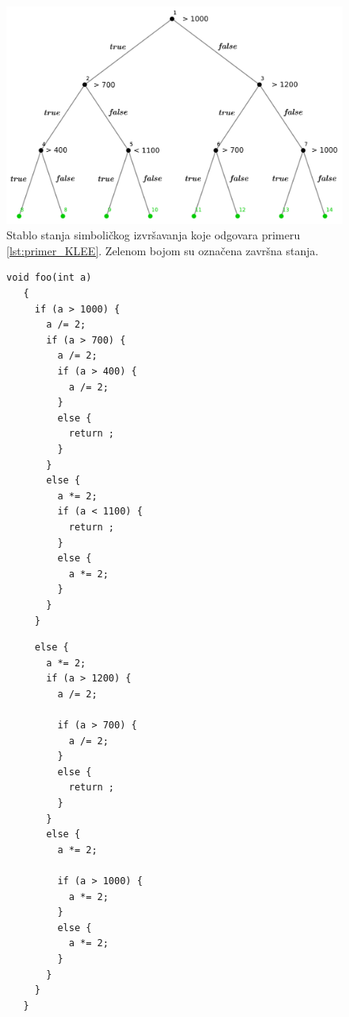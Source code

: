 \documentclass[12pt,oneside]{memoir}
\begin{document}
\begin{figure}[ht]
    \centering
    \includegraphics[width=\linewidth]{stablo_primer_1.png}
    \caption{Stablo stanja simboličkog izvršavanja koje odgovara primeru \ref{lst:primer_KLEE}. Zelenom bojom su označena završna stanja.}
    \label{fig:moj_primer}
\end{figure}

\begin{figure}
\noindent\begin{minipage}[t]{.45\textwidth}
\begin{lstlisting}[label={lst:primer_KLEE}, captionpos=b]
   void foo(int a) 
   {
     if (a > 1000) {
       a /= 2;
       if (a > 700) {
         a /= 2;
         if (a > 400) {
           a /= 2;
         }
         else {
           return ;
         }
       }
       else {
         a *= 2;
         if (a < 1100) {
           return ;
         }
         else {
           a *= 2;
         }
       }
     }
\end{lstlisting}
\end{minipage}\hfill
\begin{minipage}[t]{.45\textwidth}
\begin{lstlisting}
     else {
       a *= 2;
       if (a > 1200) {
         a /= 2;

         if (a > 700) {
           a /= 2;
         }
         else {
           return ;
         }
       }
       else {
         a *= 2;

         if (a > 1000) {
           a *= 2;
         }
         else {
           a *= 2;
         }
       }
     }
   }
\end{lstlisting}
\end{minipage}
\end{figure}
\end{document}
